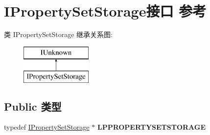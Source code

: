\hypertarget{interface_i_property_set_storage}{}\section{I\+Property\+Set\+Storage接口 参考}
\label{interface_i_property_set_storage}
类 I\+Property\+Set\+Storage 继承关系图\+:\begin{figure}[H]
\begin{center}
\leavevmode
\includegraphics[height=2.000000cm]{interface_i_property_set_storage}
\end{center}
\end{figure}
\subsection*{Public 类型}
\begin{DoxyCompactItemize}
\item 
\mbox{\label{interface_i_property_set_storage_a1279733b9e0faad09127514175b458dd}} 
typedef \hyperlink{interface_i_property_set_storage}{I\+Property\+Set\+Storage} $\ast$ {\bfseries L\+P\+P\+R\+O\+P\+E\+R\+T\+Y\+S\+E\+T\+S\+T\+O\+R\+A\+GE}
\end{DoxyCompactItemize}
